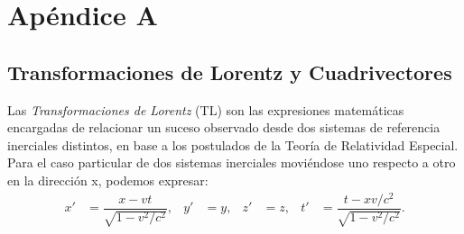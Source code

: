 \appendix
\chapter*{Apéndice A}\label{cap:A}
\setcounter{section}{0}
\renewcommand{\thesection}{A.\arabic{section}}
\setcounter{table}{0}
\renewcommand{\thetable}{A.\arabic{table}}
\setcounter{equation}{0}
\renewcommand{\theequation}{A.\arabic{equation}}

\section{Transformaciones de Lorentz y Cuadrivectores}\label{sec:Lorentz}
Las \textit{Transformaciones de Lorentz} (TL) son las expresiones matemáticas encargadas de relacionar un suceso observado desde dos sistemas de referencia inerciales distintos, en base a los postulados de la Teoría de Relatividad Especial. Para el caso particular de dos sistemas inerciales moviéndose uno respecto a otro en la dirección x, podemos expresar:
\begin{align}
x' &= \dfrac{x-vt}{\sqrt{1-v^2/c^2}}, & y' &=y, & z' &=z, & t' &=\dfrac{t-xv/c^2}{\sqrt{1-v^2/c^2}}.\label{eq:TLorentz1}
\end{align}

